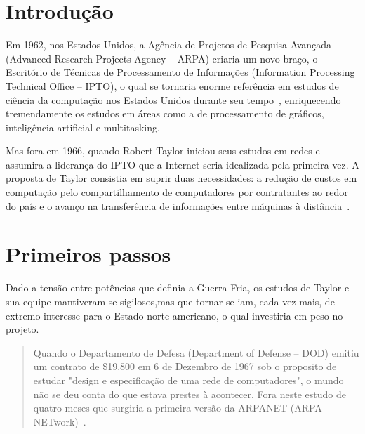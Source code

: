 \documentclass[conference]{IEEEtran}
\begin{document}

\section{Introdução}
  Em 1962, nos Estados Unidos, a Agência de Projetos de Pesquisa Avançada (Advanced Research Projects Agency -- ARPA) criaria um novo
  braço, o Escritório de Técnicas de Processamento de Informações (Information Processing Technical Office -- IPTO), o qual se
  tornaria enorme referência em estudos de ciência da computação nos Estados
  Unidos durante seu tempo~\cite{fromarpanet}, enriquecendo tremendamente os
  estudos em áreas como a de processamento de gráficos, inteligência artificial e
  multitasking.

  Mas fora em 1966, quando Robert Taylor iniciou seus estudos em redes e assumira a liderança do IPTO que a Internet seria idealizada pela primeira vez. A proposta de Taylor consistia em suprir duas necessidades: a redução de custos em computação pelo compartilhamento de computadores por contratantes ao redor do país e o avanço na transferência de informações entre máquinas à distância~\cite{fromarpanet}.

\section{Primeiros passos}
Dado a tensão entre potências que definia a Guerra Fria, os estudos de Taylor e sua equipe mantiveram-se sigilosos,mas que tornar-se-iam, cada vez mais, de extremo interesse para o Estado norte-americano, o qual investiria em peso no projeto.
  \begin{quote}
    Quando o Departamento de Defesa (Department of Defense -- DOD) emitiu um contrato de \$19.800 em
    6 de Dezembro de 1967 sob o proposito de estudar "design e especificação de uma
    rede de computadores", o mundo não se deu conta do que estava prestes à
    acontecer. Fora neste estudo de quatro meses que surgiria a primeira versão
    da ARPANET (ARPA NETwork)~\cite{internethistory}. 
  \end{quote}
\end{document}
